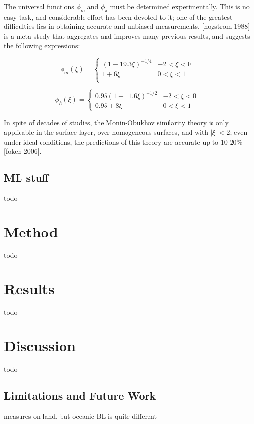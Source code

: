 \documentclass[12pt]{book}
\begin{document}
The universal functions $\phi_m$ and $\phi_h$ must be determined experimentally. This is no easy task, and considerable effort has been devoted to it; one of the greatest difficulties lies in obtaining accurate and unbiased measurements. [hogstrom 1988] is a meta-study that aggregates and improves many previous results, and suggests the following expressions:

$$
\phi_m(\xi)=\begin{cases}
(1-19.3\xi)^{-1/4} & -2<\xi<0 \\
1+6\xi & 0<\xi<1\\
\end{cases}
$$

$$
\phi_h(\xi)=\begin{cases}
0.95(1-11.6\xi)^{-1/2} & -2<\xi<0 \\
0.95+8\xi & 0<\xi<1
\end{cases}
$$

In spite of decades of studies, the Monin-Obukhov similarity theory is only applicable in the surface layer, over homogeneous surfaces, and with $\vert\xi\vert<2$; even under ideal conditions, the predictions of this theory are accurate up to 10-20\% [foken 2006].

\section{ML stuff}
todo

\chapter{Method}
todo

\chapter{Results}
todo

\chapter{Discussion}
todo

\section{Limitations and Future Work}
measures on land, but oceanic BL is quite different



\end{document}

